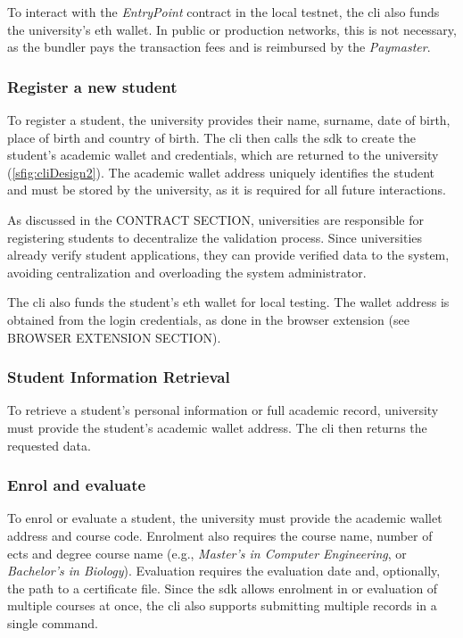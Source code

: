To interact with the \textit{EntryPoint}  contract in the local testnet, the \acrshort{cli} also funds the university's \acrshort{eth} wallet. In public or production networks, this is not necessary, as the bundler pays the transaction fees and is reimbursed by the \textit{Paymaster}.

\subsubsection{Register a new student}
To register a student, the  university provides their name, surname, date of birth, place of birth and country of birth. The \acrshort{cli} then calls the \acrshort{sdk} to create the student's academic wallet and credentials, which are returned to the university (\cref{sfig:cliDesign2}). The academic wallet address uniquely identifies the student and must be stored by the university, as it is required for all future interactions. 

As discussed in the CONTRACT SECTION, universities are responsible for registering students to decentralize the validation process. Since universities already verify student applications, they can provide verified data to the system, avoiding centralization and overloading the system administrator.

The \acrshort{cli} also funds the student's \acrlong{eth} wallet  for local testing. The wallet address is obtained from the login credentials, as done in the browser extension (see BROWSER EXTENSION SECTION).

\subsubsection{Student Information Retrieval}
To retrieve a student's personal information or full academic record, university must provide the student's academic wallet address. The \acrshort{cli} then returns the requested data.

\subsubsection{Enrol and evaluate}
To enrol or evaluate a student, the university must provide the academic wallet address and course code. Enrolment also requires the course name, number of \acrshort{ects} and degree course name (e.g., \textit{Master's in Computer Engineering}, or \textit{Bachelor's in Biology}). Evaluation requires the evaluation date and, optionally, the path to a certificate file. Since the \acrshort{sdk} allows enrolment in or evaluation of multiple courses at once, the \acrshort{cli} also supports submitting multiple records in a single command.     

